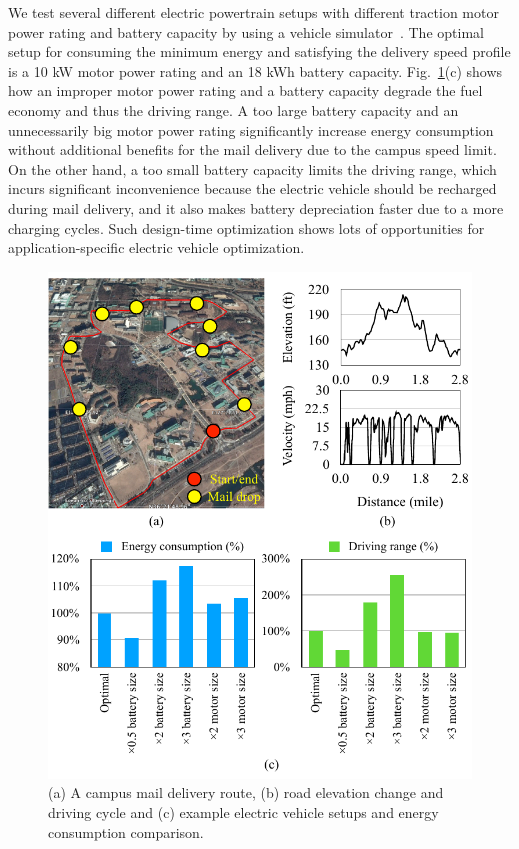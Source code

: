 \documentclass[journal]{IEEEtran}
\begin{document}
We test several different electric powertrain setups with different traction motor power rating and battery capacity by using a vehicle simulator~\cite{Markel:JPS02, Chang:ICCAD14}. The optimal setup for consuming the minimum energy and satisfying the delivery speed profile is a 10 kW motor power rating and an 18 kWh battery capacity. Fig.~\ref{fig:example_route}(c) shows how an improper motor power rating and a battery capacity degrade the fuel economy and thus the driving range. A too large battery capacity and an unnecessarily big motor power rating significantly increase energy consumption without additional benefits for the mail delivery due to the campus speed limit. On the other hand, a too small battery capacity limits the driving range, which incurs significant inconvenience because the electric vehicle should be recharged during mail delivery, and it also makes battery depreciation faster due to a more charging cycles. Such design-time optimization shows lots of opportunities for application-specific electric vehicle optimization. 

\begin{figure}
\centering
\includegraphics[width=1.0\hsize]{Figures/Campus_route.pdf}
\caption{(a) A campus mail delivery route, (b) road elevation change and driving cycle and (c) example electric vehicle setups and energy consumption comparison.}
\label{fig:example_route}
\end{figure}    
\end{document}
